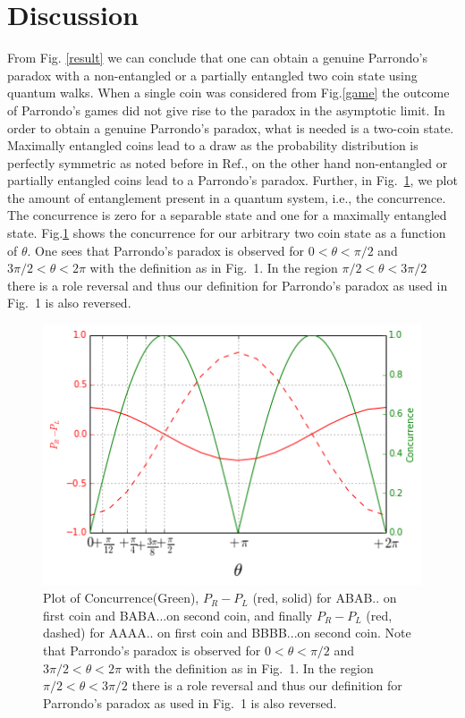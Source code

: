 \documentclass[english,aps,pra,amsmath,amssymb,showpacs,notitlepage,onecolumn]{revtex4-1}
\begin{document}
\section{Discussion}
From Fig. \ref{result} we can conclude that one can obtain a genuine Parrondo's paradox with a non-entangled or a partially entangled two coin state using  quantum walks. When a single coin was considered from Fig.\ref{game} the outcome of Parrondo's games did not give rise to the paradox in the asymptotic limit. In order to obtain a genuine Parrondo's paradox, what is needed is a two-coin state.  
Maximally entangled coins lead to a draw as the probability distribution is perfectly symmetric as noted before in Ref.\cite{entangled}, on the other hand non-entangled or partially entangled coins lead to a Parrondo's paradox. Further, in Fig.~\ref{concur}, we plot the amount of entanglement present in a quantum system, i.e., the concurrence\cite{concurrence}. The concurrence is zero for a separable state and one for a maximally entangled state. Fig.\ref{concur} shows the concurrence for our arbitrary two coin state as a function of $\theta$. One sees that Parrondo's paradox is observed for $0<\theta<\pi/2$ and $3\pi/2<\theta<2\pi$ with the definition as in Fig.~1. In the region $\pi/2 <\theta < 3\pi/2$ there is a role reversal and thus our definition for Parrondo's paradox as used in Fig.~1 is also reversed.
\begin{figure}[h]
\centering 
\includegraphics[width=.63\textwidth]{gamma.png}
\caption{Plot of Concurrence(Green), $P_{R}-P_{L}$ (red, solid) for ABAB.. on first coin and BABA...on second coin, and finally $P_{R}-P_{L}$ (red, dashed) for AAAA.. on first coin and BBBB...on second coin. Note that Parrondo's paradox is observed for $0<\theta<\pi/2$ and $3\pi/2<\theta<2\pi$ with the definition as in Fig.~1. In the region $\pi/2 <\theta < 3\pi/2$ there is a role reversal and thus our definition for Parrondo's paradox as used in Fig.~1 is also reversed. }
\label{concur}
\end{figure}
\end{document}
